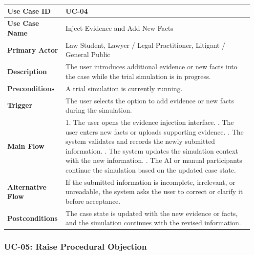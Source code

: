 \begin{longtable}{|p{4cm}|p{10cm}|}
\hline
\textbf{Use Case ID} & UC-04 \\ \hline
\textbf{Use Case Name} & Inject Evidence and Add New Facts \\ \hline
\textbf{Primary Actor} & Law Student, Lawyer / Legal Practitioner, Litigant / General Public \\ \hline
\textbf{Description} & The user introduces additional evidence or new facts into the case while the trial simulation is in progress. \\ \hline
\textbf{Preconditions} & A trial simulation is currently running. \\ \hline
\textbf{Trigger} & The user selects the option to add evidence or new facts during the simulation. \\ \hline
\textbf{Main Flow} & 
1. The user opens the evidence injection interface. \newline
2. The user enters new facts or uploads supporting evidence. \newline
3. The system validates and records the newly submitted information. \newline
4. The system updates the simulation context with the new information. \newline
5. The AI or manual participants continue the simulation based on the updated case state. \\ \hline
\textbf{Alternative Flow} & 
If the submitted information is incomplete, irrelevant, or unreadable, the system asks the user to correct or clarify it before acceptance. \\ \hline
\textbf{Postconditions} & 
The case state is updated with the new evidence or facts, and the simulation continues with the revised information. \\ \hline
\end{longtable}

\subsubsection{UC-05: Raise Procedural Objection}


